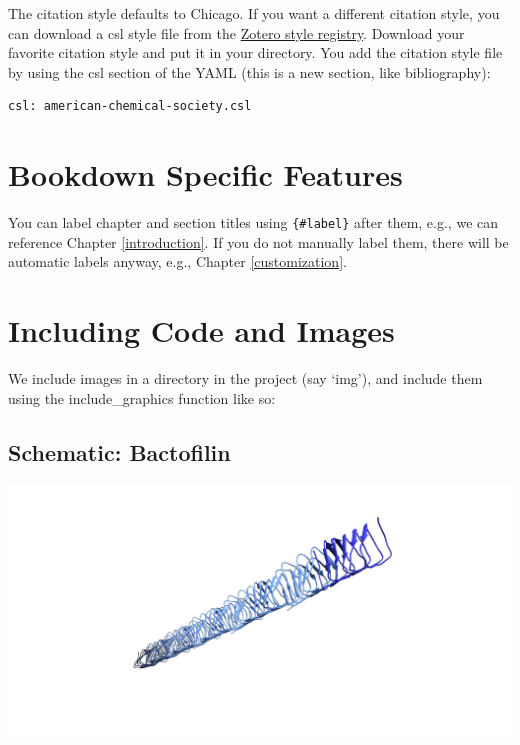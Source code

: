 \documentclass[]{tufte-book}
\begin{document}
The citation style defaults to Chicago. If you want a different citation
style, you can download a csl style file from the
\href{https://www.zotero.org/styles}{Zotero style registry}. Download
your favorite citation style and put it in your directory. You add the
citation style file by using the csl section of the YAML (this is a new
section, like bibliography):

\begin{verbatim}
csl: american-chemical-society.csl
\end{verbatim}

\section{Bookdown Specific Features}\label{bookdown-specific-features}

You can label chapter and section titles using \texttt{\{\#label\}}
after them, e.g., we can reference Chapter \ref{introduction}. If you do
not manually label them, there will be automatic labels anyway, e.g.,
Chapter \ref{customization}.

\section{Including Code and Images}\label{including-code-and-images}

We include images in a directory in the project (say `img'), and include
them using the include\_graphics function like so:

\subsection*{Schematic: Bactofilin}\label{Bactofilin}

\includegraphics{img/3_6_1}
\end{document}
